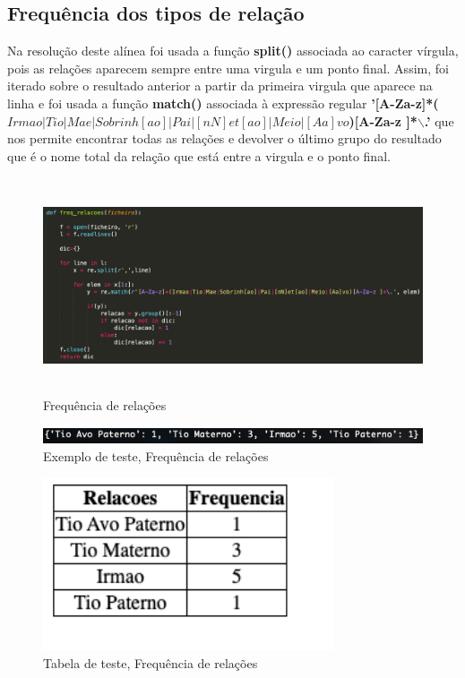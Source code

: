 \documentclass[a4paper, 12pt]{article}
\begin{document}
\subsection{Frequência dos tipos de relação}
Na resolução deste alínea foi usada a função \textbf{split()} associada ao caracter vírgula, pois as relações aparecem sempre entre uma virgula e um ponto final. Assim, foi iterado sobre o resultado anterior a partir da primeira virgula que aparece na linha e foi usada a função \textbf{match()} associada à expressão regular \textbf{'[A-Za-z]*($Irmao \vert Tio \vert Mae \vert Sobrinh[ao] \vert Pai \vert [nN]et[ao] \vert Meio \vert [Aa]vo$)[A-Za-z ]*$\backslash$.'} que nos permite encontrar todas as relações e devolver o último grupo do resultado que é o nome total da relação que está entre a virgula e o ponto final.
\begin{figure}[H]
    \centering
    \includegraphics[height=2.5in]{freq_relacoes.png}
    \caption{Frequência de relações}
    \label{fig:my_label}
\end{figure}
\begin{figure}[H]
    \centering
    \includegraphics[height=0.2in]{freq_relacoes-teste.png}
    \caption{Exemplo de teste, Frequência de relações}
    \label{fig:my_label}
\end{figure}
\begin{figure}[H]
    \centering
    \includegraphics[height=2in]{freq_relacoes-tabela.png}
    \caption{Tabela de teste, Frequência de relações}
    \label{fig:my_label}
\end{figure}
\newpage
\end{document}
